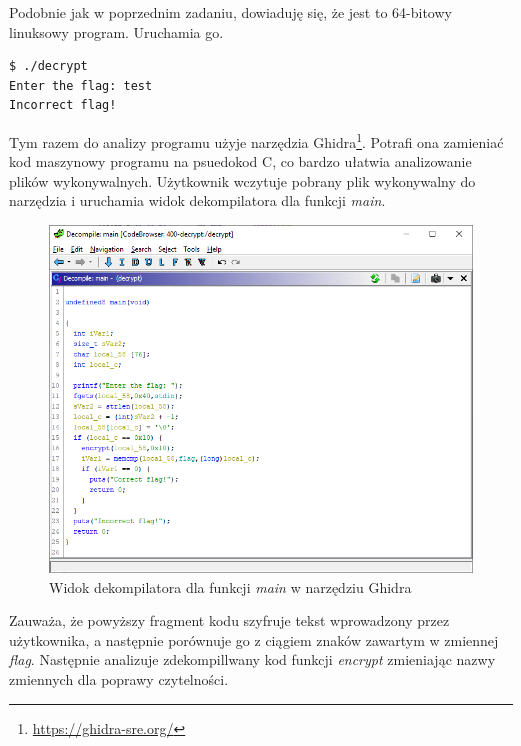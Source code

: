 \documentclass[polish,12pt]{aghthesis}
\begin{document}
Podobnie jak w poprzednim zadaniu, dowiaduję się, że jest to 64-bitowy linuksowy program.
Uruchamia go.

\begin{verbatim}
$ ./decrypt
Enter the flag: test
Incorrect flag!
\end{verbatim}

Tym razem do analizy programu użyje narzędzia Ghidra\footnote{\url{https://ghidra-sre.org/}}.
Potrafi ona zamieniać kod maszynowy programu na psuedokod C, co bardzo ułatwia
analizowanie plików wykonywalnych.
Użytkownik wczytuje pobrany plik wykonywalny do narzędzia i uruchamia widok dekompilatora
dla funkcji \emph{main}.

\begin{figure}[H]
    \centering
    \includegraphics[width=12cm]{400_main}
    \caption{Widok dekompilatora dla funkcji \emph{main} w narzędziu Ghidra}
    \label{fig:400_main}
\end{figure}

Zauważa, że powyższy fragment kodu szyfruje tekst wprowadzony przez użytkownika,
a następnie porównuje go z ciągiem znaków zawartym w zmiennej \emph{flag}.
Następnie analizuje zdekompillwany kod funkcji \emph{encrypt} zmieniając nazwy zmiennych
dla poprawy czytelności.
\end{document}
